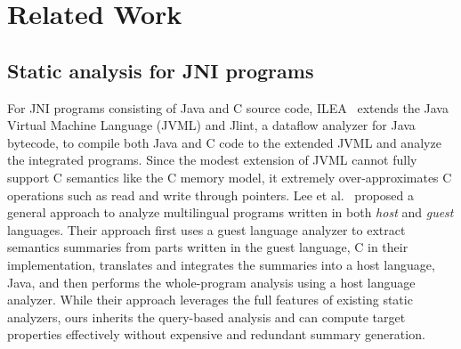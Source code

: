 \section{Related Work}\label{sec:related}
\subsection{Static analysis for JNI programs}

For JNI programs consisting of Java and C source code, ILEA~\cite{ILEA} extends
the Java Virtual Machine Language (JVML) and Jlint, a dataflow analyzer for
Java bytecode, to compile both Java and C code to the extended JVML and analyze
the integrated programs.  Since the modest extension of JVML cannot fully
support C semantics like the C memory model, it extremely over-approximates C
operations such as read and write through pointers.  Lee et al.~\cite{LeeASE20}
proposed a general approach to analyze multilingual programs written in both
{\it host} and {\it guest} languages.  Their approach first uses a guest
language analyzer to extract semantics summaries from parts written in the
guest language, C in their implementation, translates and integrates the
summaries into a host language, Java, and then performs the whole-program
analysis using a host language analyzer.  While their approach leverages the
full features of existing static analyzers, ours inherits the query-based
analysis and can compute target properties effectively without expensive and
redundant summary generation.

